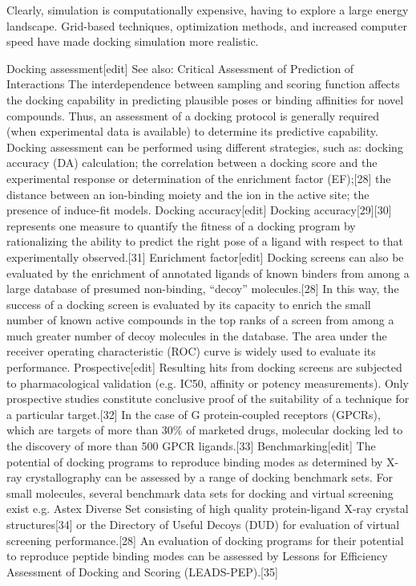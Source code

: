 Clearly, simulation is computationally expensive, having to explore a large energy landscape. Grid-based techniques, optimization methods, and increased computer speed have made docking simulation more realistic.

Docking assessment[edit]
See also: Critical Assessment of Prediction of Interactions
The interdependence between sampling and scoring function affects the docking capability in predicting plausible poses or binding affinities for novel compounds. Thus, an assessment of a docking protocol is generally required (when experimental data is available) to determine its predictive capability. Docking assessment can be performed using different strategies, such as:
docking accuracy (DA) calculation;
the correlation between a docking score and the experimental response or determination of the enrichment factor (EF);[28]
the distance between an ion-binding moiety and the ion in the active site;
the presence of induce-fit models.
Docking accuracy[edit]
Docking accuracy[29][30] represents one measure to quantify the fitness of a docking program by rationalizing the ability to predict the right pose of a ligand with respect to that experimentally observed.[31]
Enrichment factor[edit]
Docking screens can also be evaluated by the enrichment of annotated ligands of known binders from among a large database of presumed non-binding, “decoy” molecules.[28] In this way, the success of a docking screen is evaluated by its capacity to enrich the small number of known active compounds in the top ranks of a screen from among a much greater number of decoy molecules in the database. The area under the receiver operating characteristic (ROC) curve is widely used to evaluate its performance.
Prospective[edit]
Resulting hits from docking screens are subjected to pharmacological validation (e.g. IC50, affinity or potency measurements). Only prospective studies constitute conclusive proof of the suitability of a technique for a particular target.[32] In the case of G protein-coupled receptors (GPCRs), which are targets of more than 30\% of marketed drugs, molecular docking led to the discovery of more than 500 GPCR ligands.[33]
Benchmarking[edit]
The potential of docking programs to reproduce binding modes as determined by X-ray crystallography can be assessed by a range of docking benchmark sets.
For small molecules, several benchmark data sets for docking and virtual screening exist e.g. Astex Diverse Set consisting of high quality protein-ligand X-ray crystal structures[34] or the Directory of Useful Decoys (DUD) for evaluation of virtual screening performance.[28]
An evaluation of docking programs for their potential to reproduce peptide binding modes can be assessed by Lessons for Efficiency Assessment of Docking and Scoring (LEADS-PEP).[35]

